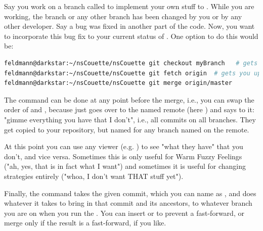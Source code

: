 \documentclass[a4paper, 11pt, DIV=11]{scrartcl}
\begin{document}
Say you work on a branch called  to implement your own stuff to \nsc.
While you are working, the  branch or any other branch has been changed
by you or by any other developer. Say a bug was fixed in another part of the code.
Now, you want to incorporate this bug fix to your current status of .
One option to do this would be:
\begin{lstlisting}[language=bash]
feldmann@darkstar:~/nsCouette/nsCouette git checkout myBranch   # gets you on your branch
feldmann@darkstar:~/nsCouette/nsCouette git fetch origin  # gets you up to date
feldmann@darkstar:~/nsCouette/nsCouette git merge origin/master
\end{lstlisting}
The  command can be done at any point before the merge, i.e., you can swap the order
of  and , because  just goes over to the named
remote (here ) and says to it: "gimme everything you have that I don't", i.e.,
all commits on all branches. They get copied to your repository, but named 
for any branch named  on the remote.
\par
At this point you can use any viewer (e.g. ) to see "what they have" that you don't,
and vice versa. Sometimes this is only useful for Warm Fuzzy Feelings ("ah, yes, that is in fact
what I want") and sometimes it is useful for changing strategies entirely ("whoa, I don't want
THAT stuff yet").
\par
Finally, the  command takes the given commit, which you can name as ,
and does whatever it takes to bring in that commit and its ancestors, to whatever branch you are on
when you run the . You can insert  or  to prevent a
fast-forward, or merge only if the result is a fast-forward, if you like.



\end{document}
